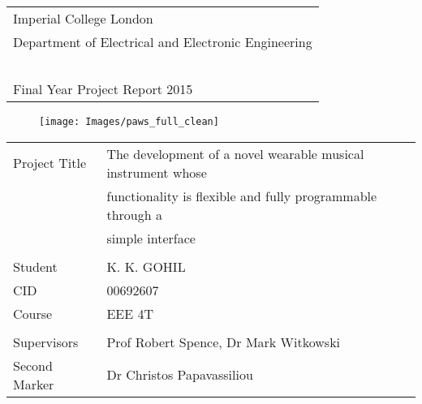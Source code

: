 \thispagestyle{empty}

\large
\begin{tabular}{|l}
Imperial College London\\
Department of Electrical and Electronic Engineering\\~\\
Final Year Project Report 2015
\end{tabular}

\vspace{80pt}
\begin{figure}[H]
   \centering
   \texttt{[image: Images/paws\_full\_clean]} 
\end{figure}


\vfill

\begin{tabular}{| l l}
Project Title & The development of a novel wearable musical instrument whose \\
& functionality is flexible and fully programmable through a \\ & simple interface \\
&\\
Student & K. K. GOHIL \\ 
CID & 00692607 \\ 
Course & EEE 4T \\ &\\
Supervisors & Prof Robert Spence, Dr Mark Witkowski \\ 
Second Marker & Dr Christos Papavassiliou 
\end{tabular}
\normalsize
\newpage